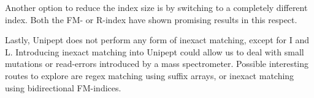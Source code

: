 \documentclass[11pt]{article}
\begin{document}
\begin{multicols}{2}
        Another option to reduce the index size is by switching to a completely different index.
        Both the FM- or R-index have shown promising results in this respect.

        Lastly, Unipept does not perform any form of inexact matching, except for I and L\@.
        Introducing inexact matching into Unipept could allow us to deal with small mutations or read-errors introduced by a mass spectrometer.
        Possible interesting routes to explore are regex matching using suffix arrays, or inexact matching using bidirectional FM-indices.
        \printbibliography
    \end{multicols}
\end{document}
